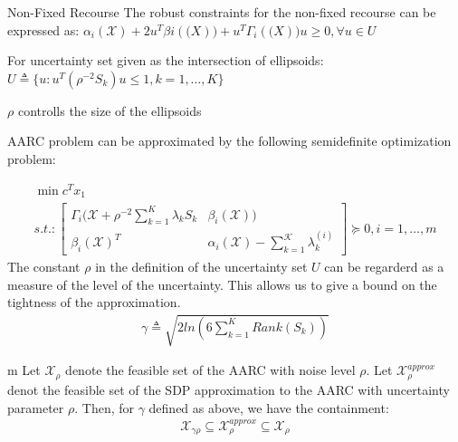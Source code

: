 \documentclass{beamer}
\begin{document}
\begin{frame}{Non-Fixed Recourse}
The robust constraints for the non-fixed recourse can be expressed as:
$\alpha_{i}(\mathcal{X}) + 2u^{T}\beta{i}(\mathcal(X)) + u^{T}\Gamma_{i}(\mathcal(X))u \geq 0, \forall u \in U$

For uncertainty set given as the intersection of ellipsoids:
$U \triangleq \{u : u^{T}(\rho^{-2}S_{k})u \leq 1, k=1,\dots,K\}$

$\rho$ controlls the size of the ellipsoids

AARC problem can be approximated by the following semidefinite optimization problem:

\begin{align*}
\min c^{T}x_{1} \\
s.t.: \begin{bmatrix}
\Gamma_{i}(\mathcal{X} + \rho^{-2}\sum_{k=1}^{K}\lambda_{k}S_{k} & \beta_{i}(\mathcal{X})) \\
\beta_{i}(\mathcal{X})^{T} & \alpha_{i}(\mathcal{X}) - \sum^{\mathcal{K}}_{k=1}\lambda_{k}^{(i)}
\end{bmatrix} \succeq 0, i = 1,\dots,m
\end{align*}
The constant $\rho$ in the definition of the uncertainty set $U$ can be regarderd as a measure of the level of the uncertainty. This allows us to give a bound on the tightness of the approximation.
\begin{align*}
\gamma \triangleq \sqrt{2ln(6\sum_{k=1}^{K}Rank(S_{k}))}
\end{align*}
\end{frame}

\begin{frame}{}m 
Let $\mathcal{X}_\rho$ denote the feasible set of the AARC with noise level $\rho$. Let $\mathcal{X}_{\rho}^{approx}$ denot the feasible set of the SDP approximation to the AARC with uncertainty parameter $\rho$. Then, for $\gamma$ defined as above, we have the containment:
\begin{align*}
\mathcal{X}_{\gamma\rho} \subseteq \mathcal{X}_{\rho}^{approx} \subseteq \mathcal{X}_{\rho}
\end{align*}
\end{frame}
\end{document}
